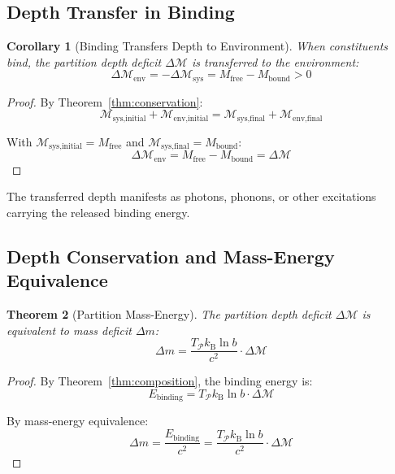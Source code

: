 \documentclass[twocolumn,10pt,a4paper]{article}
\newtheorem{theorem}{Theorem}[section]
\newtheorem{corollary}[theorem]{Corollary}
\theoremstyle{definition}
\theoremstyle{remark}
\newcommand{\kB}{k_{\mathrm{B}}}
\newcommand{\Partition}{\mathcal{P}}
\newcommand{\Depth}{\mathcal{M}}
\newcommand{\Mfree}{M_{\mathrm{free}}}
\newcommand{\Mbound}{M_{\mathrm{bound}}}
\begin{document}
\subsection{Depth Transfer in Binding}

\begin{corollary}[Binding Transfers Depth to Environment]
\label{cor:binding_transfer}
When constituents bind, the partition depth deficit $\Delta\Depth$ is transferred to the environment:
\begin{equation}
    \Delta\Depth_{\text{env}} = -\Delta\Depth_{\text{sys}} = \Mfree - \Mbound > 0
\end{equation}
\end{corollary}

\begin{proof}
By Theorem~\ref{thm:conservation}:
\begin{equation}
    \Depth_{\text{sys,initial}} + \Depth_{\text{env,initial}} = \Depth_{\text{sys,final}} + \Depth_{\text{env,final}}
\end{equation}

With $\Depth_{\text{sys,initial}} = \Mfree$ and $\Depth_{\text{sys,final}} = \Mbound$:
\begin{equation}
    \Delta\Depth_{\text{env}} = \Mfree - \Mbound = \Delta\Depth
\end{equation}
\end{proof}

The transferred depth manifests as photons, phonons, or other excitations carrying the released binding energy.

\subsection{Depth Conservation and Mass-Energy Equivalence}

\begin{theorem}[Partition Mass-Energy]
\label{thm:mass_energy}
The partition depth deficit $\Delta\Depth$ is equivalent to mass deficit $\Delta m$:
\begin{equation}
    \Delta m = \frac{T_{\Partition} \kB \ln b}{c^2} \cdot \Delta\Depth
\end{equation}
\end{theorem}

\begin{proof}
By Theorem~\ref{thm:composition}, the binding energy is:
\begin{equation}
    E_{\text{binding}} = T_{\Partition} \kB \ln b \cdot \Delta\Depth
\end{equation}

By mass-energy equivalence:
\begin{equation}
    \Delta m = \frac{E_{\text{binding}}}{c^2} = \frac{T_{\Partition} \kB \ln b}{c^2} \cdot \Delta\Depth
\end{equation}
\end{proof}
\end{document}
